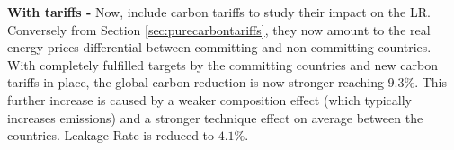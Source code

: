 \textbf{With tariffs -} Now, \textcite{Larch2017} include carbon tariffs to study their impact on the LR. Conversely from Section \ref{sec:purecarbontariffs}, they now amount to the real energy prices differential between committing and non-committing countries. With completely fulfilled targets by the committing countries and new carbon tariffs in place, the global carbon reduction is now stronger reaching $9.3\%$. This further increase is caused by a weaker composition effect (which typically increases emissions) and a stronger technique effect on average between the countries. Leakage Rate is reduced to $4.1\%$.